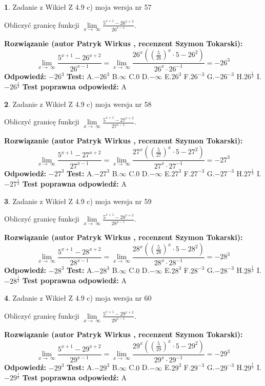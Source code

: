 \documentclass[12pt, a4paper]{article}
\theoremstyle{definition} %
\newtheorem{zad}{}
\newcommand{\zadStart}[1]{\begin{zad}#1\newline}
\newcommand{\zadStop}{\end{zad}}
\newcommand{\rozwStart}[2]{\noindent \textbf{Rozwiązanie (autor #1 , recenzent #2): }\newline}
\newcommand{\rozwStop}{\newline}
\newcommand{\odpStart}{\noindent \textbf{Odpowiedź:}\newline}
\newcommand{\odpStop}{\newline}
\newcommand{\testStart}{\noindent \textbf{Test:}\newline}
\newcommand{\testStop}{\newline}
\newcommand{\kluczStart}{\noindent \textbf{Test poprawna odpowiedź:}\newline}
\newcommand{\kluczStop}{\newline}
\begin{document}
\zadStart{Zadanie z Wikieł Z 4.9 c) moja wersja nr 57}


Obliczyć granicę funkcji  $\lim\limits_{x\to\ \infty}\frac{5^{x+1}-26^{x+2}}{26^{x-1}}$.
\zadStop
\rozwStart{Patryk Wirkus}{Szymon Tokarski}
$$\lim\limits_{x\to\ \infty}\frac{5^{x+1}-26^{x+2}}{26^{x-1}}=\lim\limits_{x\to\ \infty}\frac{26^{x}((\frac{5}{26})^{x}\cdot 5 -26^{2})}{26^{x}\cdot 26^{-1}} = -26^{3}$$
\rozwStop
\odpStart
$-26^{3}$
\odpStop
\testStart
A.$-26^{3}$ B.$\infty$ C.$0$ D.$-\infty$ E.$26^{3}$
F.$26^{-3}$ G.$-26^{-3}$
H.$26^{\frac{1}{3}}$
I.$-26^{\frac{1}{3}}$
\testStop
\kluczStart
A
\kluczStop



\zadStart{Zadanie z Wikieł Z 4.9 c) moja wersja nr 58}


Obliczyć granicę funkcji  $\lim\limits_{x\to\ \infty}\frac{5^{x+1}-27^{x+2}}{27^{x-1}}$.
\zadStop
\rozwStart{Patryk Wirkus}{Szymon Tokarski}
$$\lim\limits_{x\to\ \infty}\frac{5^{x+1}-27^{x+2}}{27^{x-1}}=\lim\limits_{x\to\ \infty}\frac{27^{x}((\frac{5}{27})^{x}\cdot 5 -27^{2})}{27^{x}\cdot 27^{-1}} = -27^{3}$$
\rozwStop
\odpStart
$-27^{3}$
\odpStop
\testStart
A.$-27^{3}$ B.$\infty$ C.$0$ D.$-\infty$ E.$27^{3}$
F.$27^{-3}$ G.$-27^{-3}$
H.$27^{\frac{1}{3}}$
I.$-27^{\frac{1}{3}}$
\testStop
\kluczStart
A
\kluczStop



\zadStart{Zadanie z Wikieł Z 4.9 c) moja wersja nr 59}


Obliczyć granicę funkcji  $\lim\limits_{x\to\ \infty}\frac{5^{x+1}-28^{x+2}}{28^{x-1}}$.
\zadStop
\rozwStart{Patryk Wirkus}{Szymon Tokarski}
$$\lim\limits_{x\to\ \infty}\frac{5^{x+1}-28^{x+2}}{28^{x-1}}=\lim\limits_{x\to\ \infty}\frac{28^{x}((\frac{5}{28})^{x}\cdot 5 -28^{2})}{28^{x}\cdot 28^{-1}} = -28^{3}$$
\rozwStop
\odpStart
$-28^{3}$
\odpStop
\testStart
A.$-28^{3}$ B.$\infty$ C.$0$ D.$-\infty$ E.$28^{3}$
F.$28^{-3}$ G.$-28^{-3}$
H.$28^{\frac{1}{3}}$
I.$-28^{\frac{1}{3}}$
\testStop
\kluczStart
A
\kluczStop



\zadStart{Zadanie z Wikieł Z 4.9 c) moja wersja nr 60}


Obliczyć granicę funkcji  $\lim\limits_{x\to\ \infty}\frac{5^{x+1}-29^{x+2}}{29^{x-1}}$.
\zadStop
\rozwStart{Patryk Wirkus}{Szymon Tokarski}
$$\lim\limits_{x\to\ \infty}\frac{5^{x+1}-29^{x+2}}{29^{x-1}}=\lim\limits_{x\to\ \infty}\frac{29^{x}((\frac{5}{29})^{x}\cdot 5 -29^{2})}{29^{x}\cdot 29^{-1}} = -29^{3}$$
\rozwStop
\odpStart
$-29^{3}$
\odpStop
\testStart
A.$-29^{3}$ B.$\infty$ C.$0$ D.$-\infty$ E.$29^{3}$
F.$29^{-3}$ G.$-29^{-3}$
H.$29^{\frac{1}{3}}$
I.$-29^{\frac{1}{3}}$
\testStop
\kluczStart
A
\kluczStop
\end{document}
